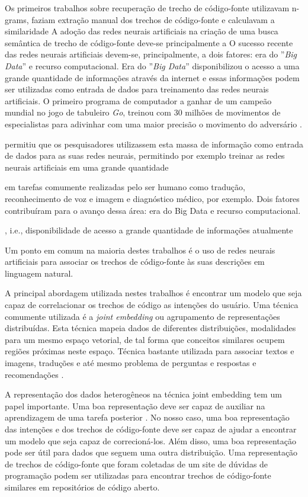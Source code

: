Os primeiros trabalhos sobre recuperação de trecho de código-fonte utilizavam n-grams, faziam extração manual dos trechos de código-fonte e calculavam a similaridade A adoção das redes neurais artificiais na criação de uma busca semântica de trecho de código-fonte deve-se principalmente a 
O sucesso recente das redes neurais artificiais devem-se, principalmente, a dois fatores: era do ''\textit{Big Data}'' e recurso computacional. Era do ''\textit{Big Data}'' disponibilizou o acesso a uma grande quantidade de informações através da internet e essas informações podem ser utilizadas como entrada de dados para treinamento das redes neurais artificiais. O primeiro programa de computador a ganhar de um campeão mundial no jogo de tabuleiro \textit{Go}, treinou com 30 milhões de movimentos de especialistas para adivinhar com uma maior precisão o movimento do adversário \citep{silver-mastering-the-game-go:2016}. 

permitiu que os pesquisadores utilizassem esta massa de informação como entrada de dados para as suas redes neurais, permitindo por exemplo  treinar as redes neurais artificiais em uma grande quantidade


em tarefas comumente realizadas pelo ser humano como tradução, reconhecimento de voz e imagem e diagnóstico médico, por exemplo. Dois fatores contribuíram para o avanço dessa área: era do Big Data e recurso computacional.


, i.e., disponibilidade de acesso a grande quantidade de informações atualmente


 Um ponto em comum na maioria destes trabalhos é o uso de redes neurais artificiais para associar os trechos de código-fonte às suas descrições em linguagem natural. 





A principal abordagem utilizada nestes trabalhos é encontrar um \gls{modelo} que seja capaz de correlacionar os trechos de código as intenções do usuário. Uma técnica comumente utilizada é a \textit{joint embedding} ou agrupamento de representações distribuídas. Esta técnica mapeia dados de diferentes distribuições, modalidades para um mesmo espaço vetorial, de tal forma que conceitos similares ocupem regiões próximas neste espaço. Técnica bastante utilizada para associar textos e imagens, traduções e até mesmo problema de perguntas e respostas e recomendações \citep{lai-etal-2018-review, Zhang:2019:deep-learning-recommender-survey}.

A representação dos dados heterogêneos na técnica joint embedding tem um papel importante. Uma boa representação deve ser capaz de auxiliar na aprendizagem de uma tarefa
posterior \citep{Goodfellow-et-al-2016:representation-learning}. No nosso caso, uma boa representação das intenções e dos trechos de código-fonte deve ser capaz de ajudar a encontrar um modelo que seja capaz de correcioná-los. Além disso, uma boa representação pode ser útil para dados que seguem uma outra distribuição. Uma representação de trechos de código-fonte que foram coletadas de um site de dúvidas de programação podem ser utilizadas para encontrar trechos de código-fonte similares em repositórios de código aberto.

